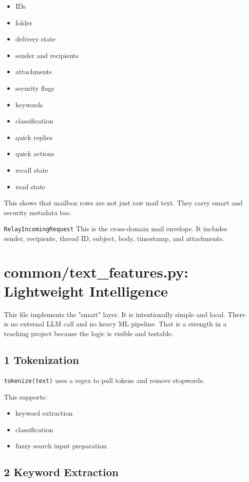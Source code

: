 \documentclass[11pt,a4paper]{article}
\begin{document}
\begin{itemize}
\item IDs
\item folder
\item delivery state
\item sender and recipients
\item attachments
\item security flags
\item keywords
\item classification
\item quick replies
\item quick actions
\item recall state
\item read state
\end{itemize}

This shows that mailbox rows are not just raw mail text. They carry smart and security metadata too.

\nolinkurl{RelayIncomingRequest} This is the cross-domain mail envelope. It includes sender, recipients, thread ID, subject, body, timestamp, and attachments.


\section{common/text\_features.py: Lightweight Intelligence}

This file implements the "smart" layer. It is intentionally simple and local. There is no external LLM call and no heavy ML pipeline. That is a strength in a teaching project because the logic is visible and testable.

\subsection{1 Tokenization}

\nolinkurl{tokenize(text)} uses a regex to pull tokens and remove stopwords.

This supports:

\begin{itemize}
\item keyword extraction
\item classification
\item fuzzy search input preparation
\end{itemize}

\subsection{2 Keyword Extraction}
\end{document}
